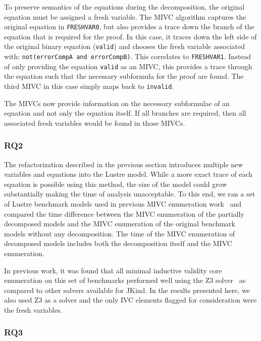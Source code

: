To preserve semantics of the equations during the decomposition, the original equation must be assigned a fresh variable. The MIVC algorithm captures the original equation in \texttt{FRESHVAR0}, but also provides a trace down the branch of the equation that is required for the proof. In this case, it traces down the left side of the original binary equation (\texttt{valid}) and chooses the fresh variable associated with: \texttt{not(errorCompA and errorCompB)}. This correlates to \texttt{FRESHVAR1}. Instead of only providing the equation \texttt{valid} as an MIVC, this provides a trace through the equation such that the necessary subformula for the proof are found. The third MIVC in this case simply maps back to \texttt{invalid}. 

The MIVCs now provide information on the necessary subformulae of an equation and not only the equation itself. If all branches are required, then all associated fresh variables would be found in those MIVCs. 

\subsubsection{RQ2}
The refactorization described in the previous section introduces multiple new variables and equations into the Lustre model. While a more exact trace of each equation is possible using this method, the size of the model could grow substantially making the time of analysis unacceptable. To this end, we ran a set of Lustre benchmark models used in previous MIVC enumeration work~\cite{ghassabani_2018} and compared the time difference between the MIVC enumeration of the partially decomposed models and the MIVC enumeration of the original benchmark models without any decomposition. The time of the MIVC enumeration of decomposed models includes both the decomposition itself and the MIVC enumeration. 

In previous work, it was found that all minimal inductive validity core enumeration on this set of benchmarks performed well using the Z3 solver~\cite{ghassabani_2018, z3} as compared to other solvers available for JKind. In the results presented here, we also used Z3 as a solver and the only IVC elements flagged for consideration were the fresh variables. 

\subsubsection{RQ3}







